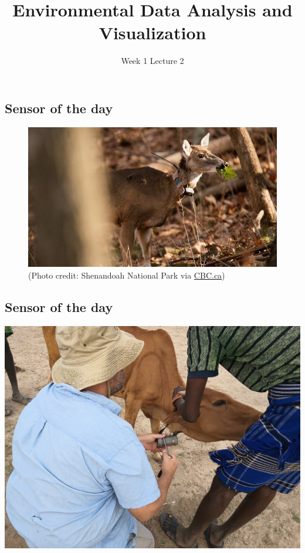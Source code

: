 \documentclass[
  letterpaper,
  DIV=11,
  numbers=noendperiod]{scrartcl}
\title{Environmental Data Analysis and Visualization}
\author{Week 1 Lecture 2}
\date{}
\begin{document}
\maketitle
\ifdefined\Shaded\renewenvironment{Shaded}{\begin{tcolorbox}[enhanced, sharp corners, interior hidden, borderline west={3pt}{0pt}{shadecolor}, frame hidden, boxrule=0pt, breakable]}{\end{tcolorbox}}\fi

\hypertarget{sensor-of-the-day}{%
\subsection{Sensor of the day}\label{sensor-of-the-day}}

\begin{figure}

{\centering \includegraphics{InClassStatic/deer-collar.jpg}

}

\caption{(Photo credit: Shenandoah National Park via
\href{https://www.cbc.ca/news/canada/british-columbia/problem-deer-get-gps-collars-ahead-of-oak-bay-birth-control-plan-1.4031937}{CBC.ca})}

\end{figure}

\hypertarget{sensor-of-the-day-1}{%
\subsection{Sensor of the day}\label{sensor-of-the-day-1}}

\includegraphics{InClassStatic/gpsCollar.jpg}
\end{document}
